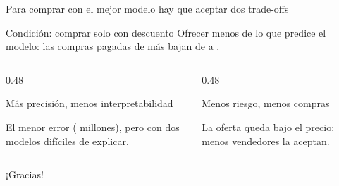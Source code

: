 \documentclass[aspectratio=169, 10pt]{beamer}
\begin{document}
\begin{frame}{Para comprar con el mejor modelo hay que aceptar dos trade-offs}
  \vspace{4mm}
  \begin{block}{Condici\'on: comprar solo con descuento}
    \small Ofrecer \MargenRegla{} menos de lo que predice el modelo: las compras pagadas de m\'as bajan de \RiesgoSinMargen{} a \RiesgoRegla.
  \end{block}
  \vspace{3mm}
  \begin{columns}[T, onlytextwidth]
    \begin{column}{0.48\textwidth}
      \begin{alertblock}{M\'as precisi\'on, menos interpretabilidad}
        \small\parbox[t][1.3cm][t]{\linewidth}{\raggedright El menor error (\MAEKaggle{} millones), pero con dos modelos dif\'iciles de explicar.}
      \end{alertblock}
    \end{column}
    \begin{column}{0.48\textwidth}
      \begin{alertblock}{Menos riesgo, menos compras}
        \small\parbox[t][1.3cm][t]{\linewidth}{\raggedright La oferta queda \OfertaTipica{} bajo el precio: menos vendedores la aceptan.}
      \end{alertblock}
    \end{column}
  \end{columns}
\end{frame}

\appendix



\begin{frame}[standout]
  ¡Gracias!
\end{frame}
\end{document}
